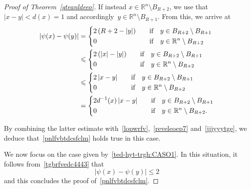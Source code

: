 \documentclass[12pt]{article}
\newcommand{\R}{\mathbb{R}}
\numberwithin{equation}{section}
\renewcommand{\leq}{\leqslant}
\begin{document}
\begin{proof}[Proof of Theorem~\ref{qteanldeeo}]
If instead $x\in \R^{n}\setminus B_{R+2}$, we use that $\left|x-y\right|<d(x)=1$
and accordingly~$y\in \R^n\setminus B_{R+1}$. From this, we arrive at
\begin{equation*}
\begin{split}
\left|\psi(x)-\psi(y)\right|&=\begin{dcases}
2\left(R+2-\left|y\right|\right)\quad &\mbox{if}\quad y\in B_{R+2}\setminus B_{R+1}\\
0\quad &\mbox{if}\quad y\in \R^n\setminus B_{R+2}
\end{dcases}\\
&\leq \begin{dcases}
2\left(\left|x\right|-\left|y\right|\right)\quad &\mbox{if}\quad y\in B_{R+2}\setminus B_{R+1}\\
0\quad &\mbox{if}\quad y\in \R^n\setminus B_{R+2}
\end{dcases}\\
&\leq \begin{dcases}
2\left|x-y\right|\quad &\mbox{if}\quad y\in B_{R+2}\setminus B_{R+1}\\
0\quad &\mbox{if}\quad y\in \R^n\setminus B_{R+2}
\end{dcases}\\
&=\begin{dcases}
2d^{-1}(x) \left|x-y\right|\quad &\mbox{if}\quad y\in B_{R+2}\setminus B_{R+1}\\
0\quad &\mbox{if}\quad y\in \R^n\setminus B_{R+2}.
\end{dcases}\\
\end{split}
\end{equation*}

By combining the latter estimate with~\eqref{lopwrfv},~\eqref{reveleoep7} and~\eqref{jjjyyytge}, we deduce that~\eqref{pnlfvbtdcsfclm} holds true in this case.

We now focus on the case given by~\eqref{ted-hyt-trgh:CASO1}.
In this situation, it follows from~\eqref{tgbrfvedc4443} that 
\begin{equation*}
\left|\psi(x)-\psi(y)\right|\leq 2
\end{equation*}
and this concludes the proof of~\eqref{pnlfvbtdcsfclm}.


\end{proof}
\end{document}
